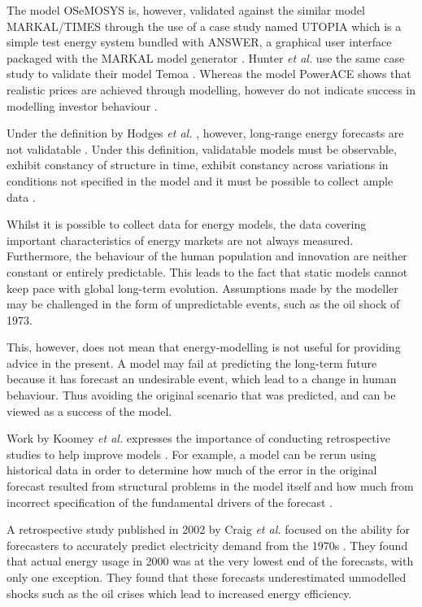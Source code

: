 \documentclass[final,3p,times,twocolumn,numbers]{elsarticle}
\begin{document}
The model OSeMOSYS \cite{Howells2011} is, however, validated against the similar model MARKAL\slash TIMES through the use of a case study named UTOPIA which is a simple test energy system bundled with ANSWER, a graphical user interface packaged with the MARKAL model generator \cite{Hunter2013, Noble2004}. Hunter \textit{et al.} use the same case study to validate their model Temoa \cite{Hunter2013}. Whereas the model PowerACE shows that realistic prices are achieved through modelling, however do not indicate success in modelling investor behaviour \cite{Ringler2012}.

Under the definition by Hodges \textit{et al.} \cite{Hodges}, however, long-range energy forecasts are not validatable \cite{Craig2002}. Under this definition, validatable models must be observable, exhibit constancy of structure in time, exhibit constancy across variations in conditions not specified in the model and it must be possible to collect ample data \cite{Hodges}.

Whilst it is possible to collect data for energy models, the data covering important characteristics of energy markets are not always measured. Furthermore, the behaviour of the human population and innovation are neither constant or entirely predictable. This leads to the fact that static models cannot keep pace with global long-term evolution. Assumptions made by the modeller may be challenged in the form of unpredictable events, such as the oil shock of 1973.

This, however, does not mean that energy-modelling is not useful for providing advice in the present. A model may fail at predicting the long-term future because it has forecast an undesirable event, which lead to a change in human behaviour. Thus avoiding the original scenario that was predicted, and can be viewed as a success of the model.

Work by Koomey \textit{et al.} expresses the importance of conducting retrospective studies to help improve models \cite{Koomey2003}. For example, a model can be rerun using historical data in order to determine how much of the error in the original forecast resulted from structural problems in the model itself and how much from incorrect specification of the fundamental drivers of the forecast \cite{Koomey2003}.

A retrospective study published in 2002 by Craig \textit{et al.} focused on the ability for forecasters to accurately predict electricity demand from the 1970s \cite{Craig2002}. They found that actual energy usage in 2000 was at the very lowest end of the forecasts, with only one exception. They found that these forecasts underestimated unmodelled shocks such as the oil crises which lead to increased energy efficiency.
\end{document}
